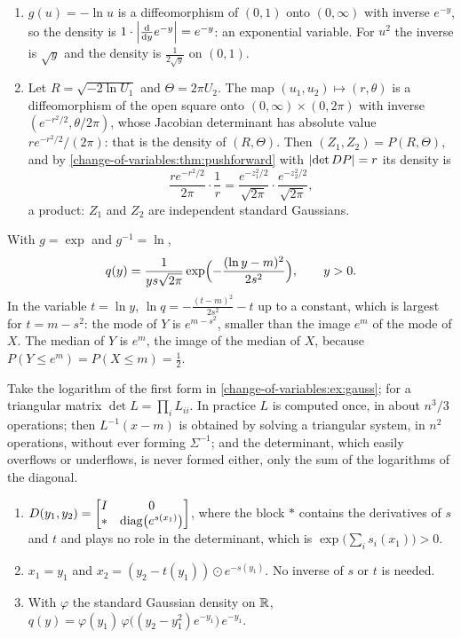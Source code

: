 \begin{enumerate}[nosep]
  \item $g(u) = -\ln u$ is a diffeomorphism of $(0, 1)$ onto
        $(0, \infty)$ with inverse $e^{-y}$, so the density is
        $1\cdot\left|\frac{\mathrm{d}}{\mathrm{d} y}e^{-y}\right| = e^{-y}$: an exponential
        variable. For $u^2$ the inverse is $\sqrt y$ and the density is
        $\frac1{2\sqrt y}$ on $(0, 1)$.
  \item Let $R = \sqrt{-2\ln U_1}$ and $\Theta = 2\pi U_2$. The map
        $(u_1, u_2)\mapsto(r, \theta)$ is a diffeomorphism of the open
        square onto $(0, \infty)\times(0, 2\pi)$ with inverse
        $(e^{-r^2/2}, \theta/2\pi)$, whose Jacobian determinant has
        absolute value $re^{-r^2/2}/(2\pi)$: that is the density of
        $(R, \Theta)$. Then $(Z_1, Z_2) = P(R, \Theta)$, and by
        \cref{change-of-variables:thm:pushforward} with
        $\left|\det DP\right| = r$ its density is
        \[
          \frac{re^{-r^2/2}}{2\pi}\cdot\frac1r
          = \frac{e^{-z_1^2/2}}{\sqrt{2\pi}}\cdot
            \frac{e^{-z_2^2/2}}{\sqrt{2\pi}} ,
        \]
        a product: $Z_1$ and $Z_2$ are independent standard Gaussians.
\end{enumerate}

With $g = \exp$ and $g^{-1} = \ln$,
\[
  q(y) = \frac1{ys\sqrt{2\pi}}
         \exp\Bigl(-\frac{(\ln y - m)^2}{2s^2}\Bigr) ,
  \qquad y > 0 .
\]
In the variable $t = \ln y$, $\ln q = -\frac{(t - m)^2}{2s^2} - t$ up to
a constant, which is largest for $t = m - s^2$: the mode of $Y$ is
$e^{m - s^2}$, smaller than the image $e^m$ of the mode of $X$. The
median of $Y$ is $e^m$, the image of the median of $X$, because
$P(Y\leq e^m) = P(X\leq m) = \frac12$.

Take the logarithm of the first form in
\cref{change-of-variables:ex:gauss}; for a triangular matrix
$\det L = \prod_iL_{ii}$. In practice $L$ is computed once, in about
$n^3/3$ operations; then $L^{-1}(x - m)$ is obtained by solving a
triangular system, in $n^2$ operations, without ever forming
$\Sigma^{-1}$; and the determinant, which easily overflows or
underflows, is never formed either, only the sum of the logarithms of
the diagonal.

\begin{enumerate}[nosep]
  \item $\displaystyle D(y_1, y_2)
        = \begin{bmatrix}I & 0\\ * & \operatorname{diag}\bigl(e^{s(x_1)}\bigr)
        \end{bmatrix}$, where the block $*$ contains the derivatives of
        $s$ and $t$ and plays no role in the determinant, which is
        $\exp\bigl(\sum_is_i(x_1)\bigr) > 0$.
  \item $x_1 = y_1$ and $x_2 = (y_2 - t(y_1))\odot e^{-s(y_1)}$. No
        inverse of $s$ or $t$ is needed.
  \item With $\varphi$ the standard Gaussian density on $\mathbb{R}$,
        $q(y) = \varphi(y_1)\,\varphi\bigl((y_2 - y_1^2)e^{-y_1}\bigr)\,
        e^{-y_1}$.
\end{enumerate}

